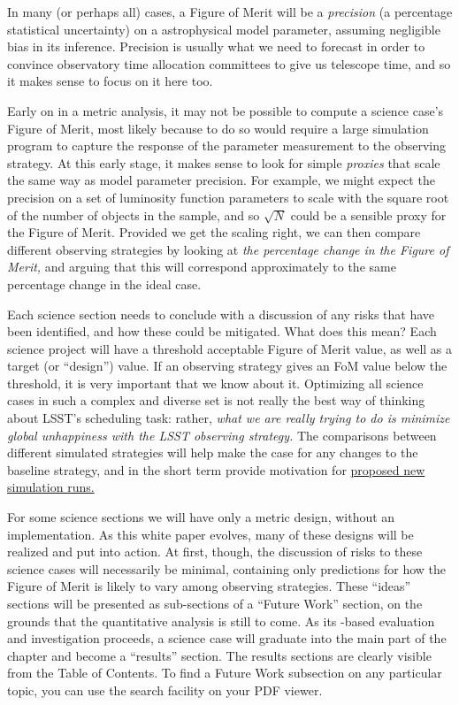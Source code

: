 In many (or perhaps all) cases, a Figure of Merit will be a
\textit{precision} (\ie a percentage statistical uncertainty) on a
astrophysical model parameter, assuming negligible bias in its
inference. Precision is usually what we need to forecast in order to
convince observatory time allocation committees to give us telescope
time, and so it makes sense to focus on it here too.

Early on in a metric analysis, it may not be possible to compute a
science case's Figure of Merit, most likely because to do so would
require a large simulation program to capture the response of the
parameter measurement to the observing strategy. At this early stage, it
makes sense to look for simple {\it proxies} that scale the same way as
model parameter precision. For example, we might expect the precision on
a set of luminosity function  parameters to scale with the square root
of the number of objects in the sample, and so $\sqrt{N}$ could be a
sensible proxy for the Figure of Merit. Provided we get the scaling
right, we can then compare different observing strategies by looking  at
{\it the percentage change in the Figure of Merit,} and arguing that
this will correspond approximately to the same percentage change in the
ideal case.

Each science section needs to conclude with a discussion of any risks
that have been identified, and how these could be mitigated. What does
this mean? Each science project will have a threshold acceptable
Figure of Merit value, as well as a target (or ``design'') value.  If
an observing strategy gives an FoM value below the threshold, it
is very important that we know about it.  Optimizing all science cases
in such a complex and diverse set is not really the best way of thinking
about LSST's scheduling task: rather, {\it what we are really
trying to do is minimize global unhappiness with the LSST observing
strategy.} The comparisons between different simulated strategies will
help make the case for any changes to the baseline strategy, and in the
short term provide motivation for
\href{https://github.com/LSSTScienceCollaborations/ObservingStrategy/blob/master/opsim/README.md}{proposed
new \OpSim simulation runs.}

For some science sections we will have only a metric design, without an
implementation. As this white paper  evolves, many of these designs will
be realized and put into action. At first, though, the discussion of
risks to these science cases will necessarily be minimal, containing
only predictions for how the Figure of Merit is likely to vary among
observing strategies. These ``ideas'' sections will be presented as
sub-sections of a ``Future Work'' section, on the grounds that the
quantitative analysis is still to come. As its \MAF-based evaluation and
investigation proceeds, a science case will graduate into the main
part of the chapter and become a ``results'' section. The results
sections are clearly visible from the Table of
Contents. To find a Future Work subsection on any particular topic,
you can use the search facility on your PDF viewer.


